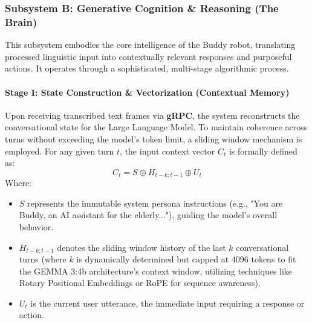 \subsubsection{Subsystem B: Generative Cognition \& Reasoning (The Brain)}
This subsystem embodies the core intelligence of the Buddy robot, translating processed linguistic input into contextually relevant responses and purposeful actions. It operates through a sophisticated, multi-stage algorithmic process.

\paragraph{Stage I: State Construction \& Vectorization (Contextual Memory)}
Upon receiving transcribed text frames via \textbf{gRPC}, the system reconstructs the conversational state for the Large Language Model. To maintain coherence across turns without exceeding the model's token limit, a sliding window mechanism is employed. For any given turn $t$, the input context vector $C_t$ is formally defined as:
\begin{equation}
    C_t = S \oplus H_{t-k:t-1} \oplus U_t
\end{equation}
Where:
\begin{itemize}
    \item $S$ represents the immutable system persona instructions (e.g., "You are Buddy, an AI assistant for the elderly..."), guiding the model's overall behavior.
    \item $H_{t-k:t-1}$ denotes the sliding window history of the last $k$ conversational turns (where $k$ is dynamically determined but capped at 4096 tokens to fit the GEMMA 3:4b architecture's context window, utilizing techniques like Rotary Positional Embeddings or RoPE for sequence awareness).
    \item $U_t$ is the current user utterance, the immediate input requiring a response or action.
\end{itemize}


